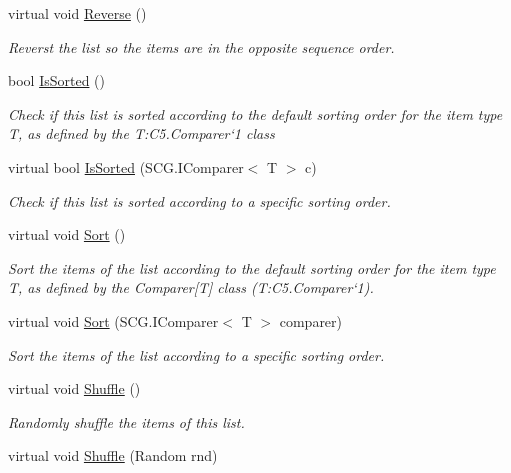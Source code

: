 \begin{DoxyCompactItemize}
\item 
virtual void \hyperlink{class_c5_1_1_array_list_ad5c4e9fcce3bdafcb4140b24e449b210}{Reverse} ()
\begin{DoxyCompactList}\small\item\em Reverst the list so the items are in the opposite sequence order. \end{DoxyCompactList}\item 
bool \hyperlink{class_c5_1_1_array_list_a9c15cf2f69d3459b4a22ecd854689768}{Is\+Sorted} ()
\begin{DoxyCompactList}\small\item\em Check if this list is sorted according to the default sorting order for the item type T, as defined by the T\+:\+C5.\+Comparer`1 class \end{DoxyCompactList}\item 
virtual bool \hyperlink{class_c5_1_1_array_list_a267b37f723053dcc17d03c789956332a}{Is\+Sorted} (S\+C\+G.\+I\+Comparer$<$ T $>$ c)
\begin{DoxyCompactList}\small\item\em Check if this list is sorted according to a specific sorting order. \end{DoxyCompactList}\item 
virtual void \hyperlink{class_c5_1_1_array_list_a2fa70a028357e88da185799b15a508cb}{Sort} ()
\begin{DoxyCompactList}\small\item\em Sort the items of the list according to the default sorting order for the item type T, as defined by the Comparer\mbox{[}T\mbox{]} class (T\+:\+C5.\+Comparer`1). \end{DoxyCompactList}\item 
virtual void \hyperlink{class_c5_1_1_array_list_af5c128e592dfdb043e8687bf3e3cad68}{Sort} (S\+C\+G.\+I\+Comparer$<$ T $>$ comparer)
\begin{DoxyCompactList}\small\item\em Sort the items of the list according to a specific sorting order. \end{DoxyCompactList}\item 
virtual void \hyperlink{class_c5_1_1_array_list_a8c7d42a5d4941fba55338f7e6a759049}{Shuffle} ()
\begin{DoxyCompactList}\small\item\em Randomly shuffle the items of this list. \end{DoxyCompactList}\item 
virtual void \hyperlink{class_c5_1_1_array_list_ae209e9cc5f70627d16a892705a11ff6f}{Shuffle} (Random rnd)

\end{DoxyCompactItemize}
